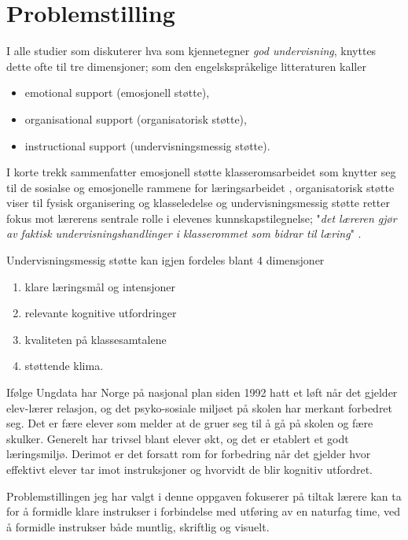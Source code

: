 \documentclass[main.tex]{subfiles}
\begin{document}
\section{Problemstilling}    
I alle studier som diskuterer hva som kjennetegner \emph{god undervisning}, knyttes 
dette ofte til tre dimensjoner\cite[Klette 2013, side 142]{klette}; som den 
engelskspråkelige litteraturen kaller 
\begin{itemize}
\item emotional support (emosjonell støtte),
\item organisational support (organisatorisk støtte),
\item instructional support (undervisningsmessig støtte).
\end{itemize}
I korte trekk sammenfatter emosjonell støtte klasseromsarbeidet som knytter
seg til de sosialse og emosjonelle rammene for læringsarbeidet \cite[Klette 2013, side 143]{klette},
organisatorisk støtte viser til fysisk organisering og klasseledelse \cite[Klette 2013, side189]{klette}
og undervisningsmessig støtte retter fokus mot lærerens sentrale rolle i elevenes kunnskapstilegnelse; "\emph{det 
læreren gjør av faktisk undervisningshandlinger i klasserommet som bidrar til læring}" 
\cite[Klette 2013, side 143 og 146]{klette}.
\newline

Undervisningsmessig støtte kan igjen fordeles blant 4 dimensjoner\cite[Klette 2013, side 146]{klette}
\begin{enumerate}
\item klare læringsmål og intensjoner
\item relevante kognitive utfordringer
\item kvaliteten på klassesamtalene
\item støttende klima.
\end{enumerate}

Ifølge Ungdata\cite{ungdata}\cite[Klette, side 144]{klette} har Norge på nasjonal 
plan siden 1992 hatt et løft når det gjelder elev-lærer 
relasjon, og det psyko-sosiale miljøet på skolen har merkant 
forbedret seg. Det er fære elever som melder at de gruer seg til å 
gå på skolen og fære skulker. Generelt har trivsel 
blant elever økt, og det er etablert et godt læringsmiljø. Derimot er det 
forsatt rom for forbedring når det gjelder hvor effektivt elever tar imot 
instruksjoner og hvorvidt de blir kognitiv utfordret. 
\newline

Problemstillingen jeg har valgt i denne oppgaven fokuserer på tiltak lærere kan ta for å
formidle klare instrukser i forbindelse med utføring av en naturfag time, ved å formidle instrukser 
både muntlig, skriftlig og visuelt.
\newline
\end{document}
